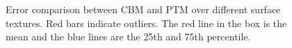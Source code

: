 \begin{figure}[h!p]
\centering
{}
\caption{Error comparison between CBM and PTM over
different surface textures. Red bars indicate outliers. The red line in the box
is the mean and the blue lines are the 25th and 75th percentile.}
\end{figure}

